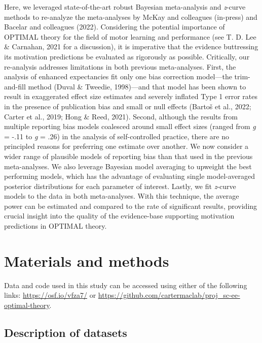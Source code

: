 \documentclass[
  man, donotrepeattitle,floatsintext]{apa7}
\begin{document}
Here, we leveraged state-of-the-art robust Bayesian meta-analysis and \emph{z}-curve methods to re-analyze the meta-analyses by McKay and colleagues (in-press) and Bacelar and colleagues (2022). Considering the potential importance of OPTIMAL theory for the field of motor learning and performance (see T. D. Lee \& Carnahan, 2021 for a discussion), it is imperative that the evidence buttressing its motivation predictions be evaluated as rigorously as possible. Critically, our re-analysis addresses limitations in both previous meta-analyses. First, the analysis of enhanced expectancies fit only one bias correction model---the trim-and-fill method (Duval \& Tweedie, 1998)---and that model has been shown to result in exaggerated effect size estimates and severely inflated Type 1 error rates in the presence of publication bias and small or null effects (Bartoš et al., 2022; Carter et al., 2019; Hong \& Reed, 2021). Second, although the results from multiple reporting bias models coalesced around small effect sizes (ranged from \emph{g} = -.11 to \emph{g} = .26) in the analysis of self-controlled practice, there are no principled reasons for preferring one estimate over another. We now consider a wider range of plausible models of reporting bias than that used in the previous meta-analyses. We also leverage Bayesian model averaging to upweight the best performing models, which has the advantage of evaluating single model-averaged posterior distributions for each parameter of interest. Lastly, we fit \emph{z}-curve models to the data in both meta-analyses. With this technique, the average power can be estimated and compared to the rate of significant results, providing crucial insight into the quality of the evidence-base supporting motivation predictions in OPTIMAL theory.

\hypertarget{materials-and-methods}{%
\section{Materials and methods}\label{materials-and-methods}}

Data and code used in this study can be accessed using either of the following links: \url{https://osf.io/vfza7/} or \url{https://github.com/cartermaclab/proj_sc-ee-optimal-theory}.

\hypertarget{description-of-datasets}{%
\subsection{Description of datasets}\label{description-of-datasets}}
\end{document}
